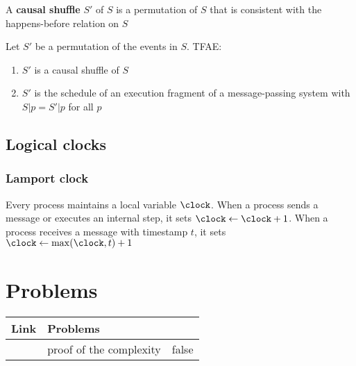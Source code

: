 \documentclass[11pt]{article}
\begin{document}
A \textbf{causal shuffle} \(S'\) of \(S\) is a permutation of \(S\) that is consistent with the happens-before
relation on \(S\)

\begin{lemma}[]
Let \(S'\) be a permutation of the events in \(S\). TFAE:
\begin{enumerate}
\item \(S'\) is a causal shuffle of \(S\)
\item \(S'\) is the schedule of an execution fragment of a message-passing system with \(S|p=S'|p\)
for all \(p\)
\end{enumerate}
\end{lemma}
\subsection{Logical clocks}
\label{sec:org7f2a88b}
\subsubsection{Lamport clock}
\label{sec:org83176b8}
Every process maintains a local variable \(\clock\). When a process sends a message or executes an
internal step, it sets \(\clock\gets\clock+1\). When a process receives a message with timestamp \(t\), it
sets \(\clock\gets\max(\clock,t)+1\)
\section{Problems}
\label{sec:orgf1e6bfa}
\begin{center}
\begin{tabular}{lll}
Link & Problems & \\
\hline
\label{Problem BFS} & proof of the complexity & false\\
\end{tabular}
\end{center}
\end{document}
